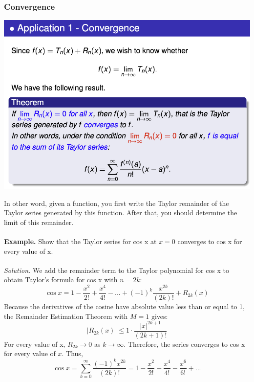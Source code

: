 \documentclass{article}
\begin{document}
\subsubsection{Convergence} 
\begin{center}
    \includegraphics[scale=0.7]{appli 1-convergence.png}
\end{center}
In other word, given a function, you first write the Taylor remainder of the Taylor series generated by this function. After that, you should determine the limit of this remainder.  \\ \\ 
\textbf{Example.} Show that the Taylor series for cos x at $x=0$ converges to cos x for every value of x. \\ \\ 
\textit{Solution. } We add the remainder term to the Taylor polynomial for cos x to obtain Taylor’s formula for cos x with $n = 2k$:
$$ \cos x =  1 - \frac{x^2}{2!} + \frac{x^4}{4!} - ... + (-1)^k \frac{x^{2k}}{(2k)!}+ R_{2k}(x) $$
Because the derivatives of the cosine have absolute value less than or equal to 1, the
Remainder Estimation Theorem with $M = 1$ gives:
$$ |R_{2k}(x)| \leq 1 \cdot \frac{|x|^{2k+1}}{(2k+1)!}$$
For every value of x, $R_{2k} \to 0$ as $k \to \infty$. Therefore, the series converges to cos x for every value of $x$. Thus,
$$ \cos x = \sum_{k=0}^{\infty} \frac{(-1)^k x^{2k}}{(2k)!} = 1 - \frac{x^2}{2!} + \frac{x^4}{4!} - \frac{x^6}{6!} + ...$$
\end{document}
